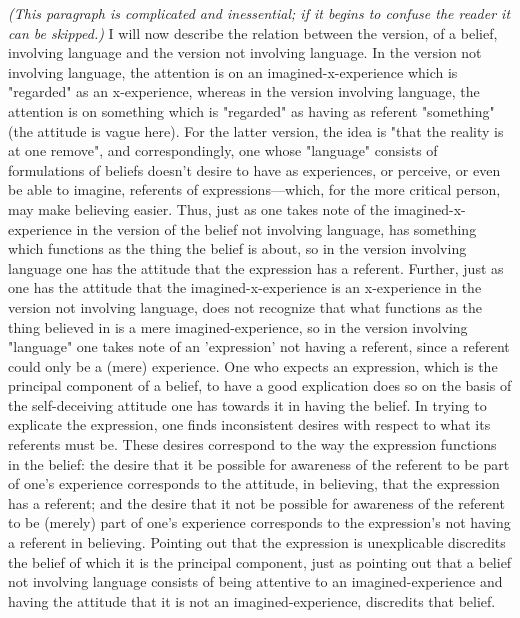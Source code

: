 \documentclass[10pt,twoside,draft]{memoir}
\newcommand{\inlineaside}[1]{\textit{(#1)}}
\begin{document}
{\inlineaside{This paragraph is complicated and inessential; if it begins to confuse 
the reader it can be skipped.} I will now describe the relation between the 
version, of a belief, involving language and the version not involving 
language. In the version not involving language, the attention is on an 
imagined-x-experience which is "regarded" as an x-experience, whereas in 
the version involving language, the attention is on something which is 
"regarded" as having as referent "something" (the attitude is vague here). 
For the latter version, the idea is "that the reality is at one remove", and 
correspondingly, one whose "language" consists of formulations of beliefs 
doesn't desire to have as experiences, or perceive, or even be able to imagine, 
referents of expressions---which, for the more critical person, may make 
believing easier. Thus, just as one takes note of the imagined-x-experience in 
the version of the belief not involving language, has something which 
functions as the thing the belief is about, so in the version involving language 
one has the attitude that the expression has a referent. Further, just as one 
has the attitude that the imagined-x-experience is an x-experience in the 
version not involving language, does not recognize that what functions as the 
thing believed in is a mere imagined-experience, so in the version involving 
"language" one takes note of an 'expression' not having a referent, since a 
referent could only be a (mere) experience. One who expects an expression, 
which is the principal component of a belief, to have a good explication does 
so on the basis of the self-deceiving attitude one has towards it in having the 
belief. In trying to explicate the expression, one finds inconsistent desires 
with respect to what its referents must be. These desires correspond to the 
way the expression functions in the belief: the desire that it be possible for 
awareness of the referent to be part of one's experience corresponds to the 
attitude, in believing, that the expression has a referent; and the desire that it 
not be possible for awareness of the referent to be (merely) part of one's 
experience corresponds to the expression's not having a referent in believing. 
Pointing out that the expression is unexplicable discredits the belief of which 
it is the principal component, just as pointing out that a belief not involving 
language consists of being attentive to an imagined-experience and having the 
attitude that it is not an imagined-experience, discredits that belief. 

}
\end{document}
